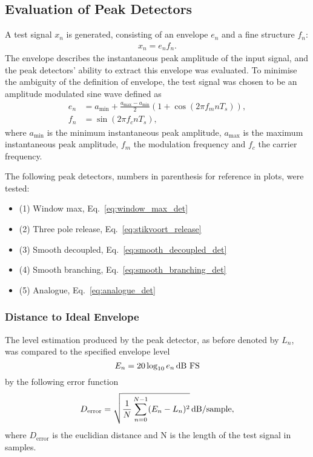 \documentclass[../main2.tex]{subfiles}
\begin{document}
\subsection{Evaluation of Peak Detectors}\label{method_peak_detectors}
A test signal $x_n$ is generated, consisting of an envelope $e_n$ and a fine structure $f_n$:
\begin{align}
x_n = e_n f_n.
\end{align}
The envelope describes the instantaneous peak amplitude of the input signal, and the peak detectors' ability to extract this envelope was evaluated. To minimise the ambiguity of the definition of envelope, the test signal was chosen to be an amplitude modulated sine wave defined as
\begin{equation}
\begin{split}
	e_n &= a_\text{min} + \frac{a_\text{max}- a_\text{min}}{2} \left(1 + \cos(2 \pi f_m n T_s) \right), \\
	f_n &= \sin(2 \pi f_c n T_s),
\end{split} \label{eq:test_signal}
\end{equation}
where $a_\text{min}$ is the minimum instantaneous peak amplitude, $a_\text{max}$ is the maximum instantaneous peak amplitude, $f_m$ the modulation frequency and $f_c$ the carrier frequency.

The following peak detectors, numbers in parenthesis for reference in plots, were tested:
\begin{itemize}
\item (1) Window max, Eq.~\eqref{eq:window_max_det}
\item (2) Three pole release, Eq.~\eqref{eq:stikvoort_release}
\item (3) Smooth decoupled, Eq.~\eqref{eq:smooth_decoupled_det}
\item (4) Smooth branching, Eq.~\eqref{eq:smooth_branching_det}
\item (5) Analogue,  Eq.~\eqref{eq:analogue_det}
\end{itemize}

\subsubsection{Distance to Ideal Envelope}
The level estimation produced by the peak detector, as before denoted by $L_n$, was compared to the specified envelope level
\begin{equation}
E_n = 20 \log_{10} e_n \mskip3mu\text{dB FS}
\end{equation}
by the following error function
\begin{equation}
D_\text{error} = \sqrt{ \frac{1}{N}\sum_{n = 0}^{N-1} (E_n - L_n)^2 } \mskip3mu\text{dB} / \text{sample},
\end{equation}
where $D_\text{error}$ is the euclidian distance and N is the length of the test signal in samples. 
\end{document}
